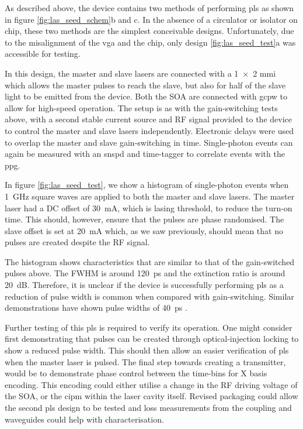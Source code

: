 As described above, the device contains two methods of performing \ac{pls} as shown in figure \ref{fig:las_seed_schem}b and c. In the absence of a circulator or isolator on chip, these two methods are the simplest conceivable designs. Unfortunately, due to the misalignment of the \ac{vga} and the chip, only design \ref{fig:las_seed_test}a was accessible for testing. 

In this design, the master and slave lasers are connected with a \num{1x2} \ac{mmi} which allows the master pulses to reach the slave, but also for half of the slave light to be emitted from the device. Both the \ac{SOA} are connected with \ac{gcpw} to allow for high-speed operation. The setup is as with the gain-switching tests above, with a second stable current source and RF signal provided to the device to control the master and slave lasers independently. Electronic delays were used to overlap the master and slave gain-switching in time. Single-photon events can again be measured with an \ac{snspd} and time-tagger to correlate events with the \ac{ppg}.

In figure \ref{fig:las_seed_test}, we show a histogram of single-photon events when \SI{1}{GHz} square waves are applied to both the master and slave lasers. The master laser had a DC offset of \SI{30}{\mA}, which is lasing threshold, to reduce the turn-on time. This should, however, ensure that the pulses are phase randomised. The slave offset is set at \SI{20}{\mA} which, as we saw previously, should mean that no pulses are created despite the RF signal. 

The histogram shows characteristics that are similar to that of the gain-switched pulses above. The \ac{FWHM} is around \SI{120}{ps} and the extinction ratio is around \SI{20}{dB}. Therefore, it is unclear if the device is successfully performing \ac{pls} as a reduction of pulse width is common when compared with gain-switching. Similar demonstrations have shown pulse widths of \SI{40}{ps} \cite{paraiso2019, Comandar2016PLS}.

Further testing of this \ac{pls} is required to verify its operation. One might consider first demonstrating that pulses can be created through optical-injection locking \cite{Seo1996, Gunning1996} to show a reduced pulse width. This should then allow an easier verification of \ac{pls} when the master laser is pulsed. The final step towards creating a transmitter, would be to demonstrate phase control between the time-bins for X basis encoding. This encoding could either utilise a change in the RF driving voltage of the \ac{SOA}, or the \ac{cipm} within the laser cavity itself. Revised packaging could allow the second \ac{pls} design to be tested and loss measurements from the coupling and waveguides could help with characterisation.

